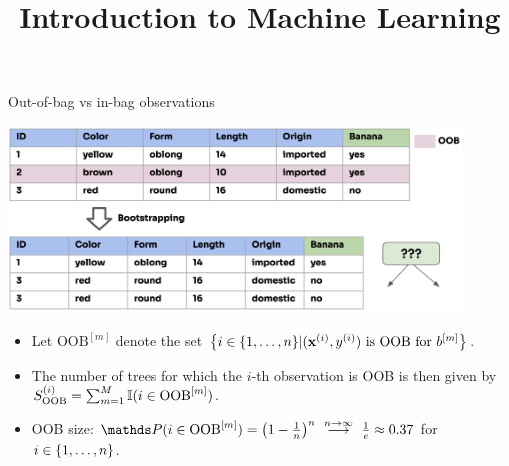 \documentclass[11pt,compress,t,notes=noshow,xcolor=table]{beamer}
\title{Introduction to Machine Learning}
\institute{\href{https://compstat-lmu.github.io/lecture_i2ml/}{compstat-lmu.github.io/lecture\_i2ml}}
\date{}
\begin{document}
\sloppy


\begin{vbframe}{Out-of-bag vs in-bag observations}
  
\begin{center}
  \includegraphics[width=0.9\textwidth]{figure_man/forest-oob.png}
\end{center}

\begin{itemize}
  \item Let $\text{OOB}^{[m]}$ denote the set 
  $\left \{i \in \{1, \ldots, n\} | (\mathbf{x}^{(i)}, y^{(i)}) \text{ is OOB for } b^{[m]} \right \}$.
  \item The number of trees for which the $i$-th observation is OOB is then 
  given by $S_{\text{OOB}}^{(i)} = 
  \sum_{m = 1}^M \mathbb{I}(i \in \text{OOB}^{[m]})$.
  \item OOB size: $\P(i \in \text{OOB}^{[m]}) = \left(1 - \frac{1}{n}\right)^n 
  \ \stackrel{n \to \infty}{\longrightarrow} \ \frac{1}{e} \approx 0.37$ for 
  $i \in \{1, \ldots, n\}$.
\end{itemize}

\end{vbframe}
\end{document}
